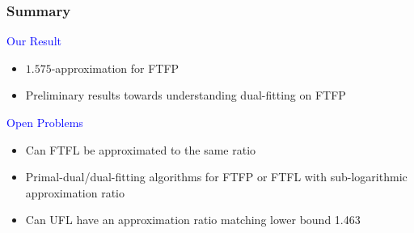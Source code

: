 \documentclass[handout, hyperref, dvipsnames]{beamer}
\begin{document}
\begin{frame}
  \frametitle{Summary}
  
  {\Large \textcolor{blue}{
  Our Result}}
  \begin{itemize}\addtolength{\itemsep}{1\baselineskip}
  \item $1.575$-approximation for FTFP
  \item Preliminary results towards understanding
    dual-fitting on FTFP
  \end{itemize}

  \vspace{.3in}
  {\Large \textcolor{blue}{
  Open Problems}}
  \begin{itemize}
  \item Can FTFL be approximated to the same ratio
  \item Primal-dual/dual-fitting algorithms for FTFP or FTFL with sub-logarithmic approximation ratio
  \item Can UFL have an approximation ratio matching lower bound 1.463
  \end{itemize}

\end{frame}

\end{document}

